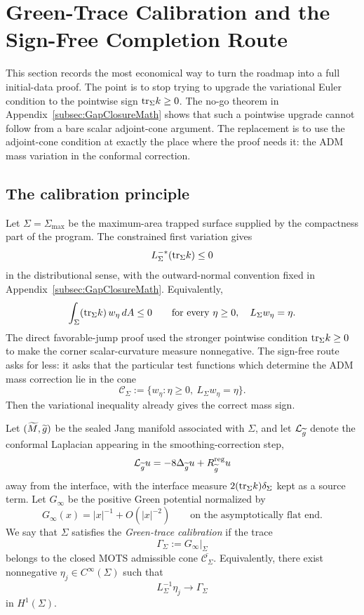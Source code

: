 \section{Green-Trace Calibration and the Sign-Free Completion Route}
\label{sec:GreenTraceCalibration}

This section records the most economical way to turn the roadmap into a full initial-data proof. The point is to stop trying to upgrade the variational Euler condition to the pointwise sign
\(\mathrm{tr}_\Sigma k\ge0\). The no-go theorem in Appendix~\ref{subsec:GapClosureMath} shows that such a pointwise upgrade cannot follow from a bare scalar adjoint-cone argument. The replacement is to use the adjoint-cone condition at exactly the place where the proof needs it: the ADM mass variation in the conformal correction.

\subsection{The calibration principle}

Let \(\Sigma=\Sigma_{\max}\) be the maximum-area trapped surface supplied by the compactness part of the program. The constrained first variation gives
\[
    L_\Sigma^{-*}(\mathrm{tr}_\Sigma k)\le0
\]
in the distributional sense, with the outward-normal convention fixed in Appendix~\ref{subsec:GapClosureMath}. Equivalently,
\begin{equation}\label{eq:AdjointConePairing37}
    \int_\Sigma (\mathrm{tr}_\Sigma k)\,w_\eta\,dA \le 0
    \qquad\text{for every }\eta\ge0,\quad L_\Sigma w_\eta=\eta .
\end{equation}
The direct favorable-jump proof used the stronger pointwise condition \(\mathrm{tr}_\Sigma k\ge0\) to make the corner scalar-curvature measure nonnegative. The sign-free route asks for less: it asks that the particular test functions which determine the ADM mass correction lie in the cone
\[
    \mathcal C_\Sigma:=\{w_\eta:\eta\ge0,\ L_\Sigma w_\eta=\eta\}.
\]
Then the variational inequality already gives the correct mass sign.

\begin{definition}\label{def:GreenTraceCalibration}
Let \((\widetilde{M},\widetilde{g})\) be the sealed Jang manifold associated with \(\Sigma\), and let \(\mathcal L_{\widetilde{g}}\) denote the conformal Laplacian appearing in the smoothing-correction step,
\[
    \mathcal L_{\widetilde{g}}u=-8\Delta_{\widetilde{g}}u+R_{\widetilde{g}}^{\mathrm{reg}}u
\]
away from the interface, with the interface measure \(2(\mathrm{tr}_\Sigma k)\delta_\Sigma\) kept as a source term. Let \(G_\infty\) be the positive Green potential normalized by
\[
    G_\infty(x)=|x|^{-1}+O(|x|^{-2})
    \qquad\text{on the asymptotically flat end}.
\]
We say that \(\Sigma\) satisfies the \emph{Green-trace calibration} if the trace
\[
    \Gamma_\Sigma:=G_\infty|_\Sigma
\]
belongs to the closed MOTS admissible cone \(\overline{\mathcal C_\Sigma}\). Equivalently, there exist nonnegative \(\eta_j\in C^\infty(\Sigma)\) such that
\[
    L_\Sigma^{-1}\eta_j\to \Gamma_\Sigma
\]
in \(H^1(\Sigma)\).
\end{definition}

